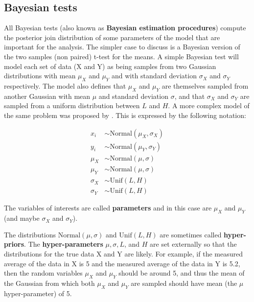 \documentclass[twoside,11pt,preprint]{article}
\begin{document}
\hypertarget{bayesian-tests}{%
\subsection{\texorpdfstring{Bayesian tests \label{sec:bayestests}}{Bayesian tests }}\label{bayesian-tests}}

All Bayesian tests (also known as \textbf{Bayesian estimation procedures})
compute the posterior join distribution of some parameters of the model
that are important for the analysis. The simpler case to discuss is a
Bayesian version of the two samples (non paired) t-test for the means.
A simple Bayesian test will model each set of data (X and Y) as being
samples from two Gaussian distributions with mean \(\mu_X\) and \(\mu_Y\)
and with standard deviation \(\sigma_X\) and \(\sigma_Y\) respectively.
The model also defines that \(\mu_X\) and \(\mu_Y\) are themselves sampled
from another Gaussian with mean \(\mu\) and standard deviation \(\sigma\),
and that \(\sigma_X\) and \(\sigma_Y\) are sampled from a uniform
distribution between \(L\) and \(H\). A more complex model of the same
problem was proposed by \citet{kruschke2013bayesian}. This is expressed by
the following notation:

\begin{align}
x_i & \sim \mbox{Normal}(\mu_X, \sigma_X) \nonumber\\
y_i & \sim \mbox{Normal} (\mu_Y, \sigma_Y)\nonumber\\
\mu_X & \sim \mbox{Normal} (\mu,\sigma) \nonumber\\
\mu_Y & \sim \mbox{Normal} (\mu,\sigma) \label{eq:mod2}\\
\sigma_X & \sim \mbox{Unif}(L,H)\nonumber\\
\sigma_Y & \sim \mbox{Unif}(L,H) \nonumber 
\end{align}

The variables of interests are called \textbf{parameters} and in this case
are \(\mu_X\) and \(\mu_Y\) (and maybe \(\sigma_X\) and \(\sigma_Y\)).

The distributions \(\mbox{Normal} (\mu,\sigma)\) and \(\mbox{Unif}(L,H)\)
are sometimes called \textbf{hyper-priors}. The \textbf{hyper-parameters} \(\mu, \sigma, L\), and \(H\) are set externally so that the distributions for
the true data X and Y are likely. For example, if the measured
average of the data in X is 5 and the measured average of the data in
Y is 5.2, then the random variables \(\mu_X\) and \(\mu_Y\) should be
around 5, and thus the mean of the Gaussian from which both \(\mu_X\)
and \(\mu_Y\) are sampled should have mean (the \(\mu\) hyper-parameter)
of 5.
\end{document}
